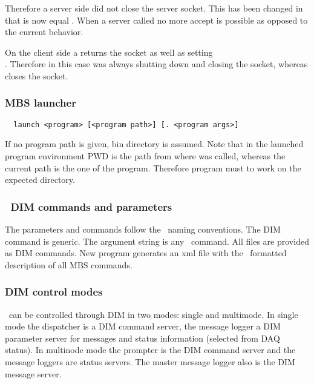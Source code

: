 Therefore a server side  did not close the server socket. This has been changed in that  is now equal . When a server called  no more accept is possible as opposed to the current behavior.

On the client side a  returns the socket as well as setting\\ . Therefore in this case  was always shutting down and closing the socket, whereas  closes the socket.
\subsubsection{MBS launcher}
\begin{verbatim}
  launch <program> [<program path>] [. <program args>]
\end{verbatim}
If no program path is given,  bin directory is assumed. Note that in the launched program environment PWD is the path from where  was called, whereas the current path is the one of the program. Therefore program must  to work on the expected directory.
\subsubsection{\mbs\ DIM commands and parameters}
The parameters and commands follow the \dabc\ naming conventions. The DIM command  is generic. The argument string is any \mbs\ command. All  files are provided as DIM commands. New program  generates an xml file with the \dabc\ formatted description of all MBS commands.
\subsubsection{DIM control modes}
\mbs\ can be controlled through DIM in two modes: single and multimode. In single mode the dispatcher is a DIM command server, the message logger a DIM parameter server for messages and status information (selected from DAQ status). In multinode mode the prompter is the DIM command server and the message loggers are status servers. The master message logger also is the DIM message server.

